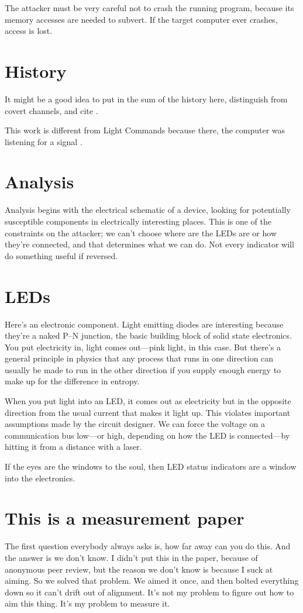 \documentclass[letterpaper]{article}
\begin{document}
The attacker must be very careful not to crash the running program, because its
memory accesses are needed to subvert. If the target computer ever crashes,
access is lost.
\section{History}
It might be a good idea to put in the sum of the history here, distinguish from
covert channels, and cite \cite{Kuhnapfel2021b}.

This work is different from Light Commands because there, the computer was
listening for a signal \cite{Sugawara2019,Rampazzi2020}.
\section{Analysis}
Analysis begins with the electrical schematic of a device, looking for
potentially susceptible components in electrically interesting places. This is
one of the constraints on the attacker; we can't choose where are the LEDs are
or how they're connected, and that determines what we can do. Not every
indicator will do something useful if reversed.
\section{LEDs}
Here's an electronic component. Light emitting diodes are interesting because
they're a naked P--N junction, the basic building block of solid state
electronics. You put electricity in, light comes out---pink light, in this
case. But there's a general principle in physics that any process that runs in
one direction can usually be made to run in the other direction if you supply
enough energy to make up for the difference in entropy.

When you put light into an LED, it comes out as electricity but in the opposite
direction from the usual current that makes it light up. This violates
important assumptions made by the circuit designer. We can force the voltage on
a communication bus low---or high, depending on how the LED is connected---by
hitting it from a distance with a laser.

If the eyes are the windows to the soul, then LED status indicators are a
window into the electronics.
\section{This is a measurement paper}
The first question everybody always asks is, how far away can you do this. And
the answer is we don't know. I didn't put this in the paper, because of
anonymous peer review, but the reason we don't know is because I suck at
aiming. So we solved that problem. We aimed it once, and then bolted everything
down so it can't drift out of alignment. It's not my problem to figure out how
to aim this thing. It's my problem to measure it.
\end{document}
